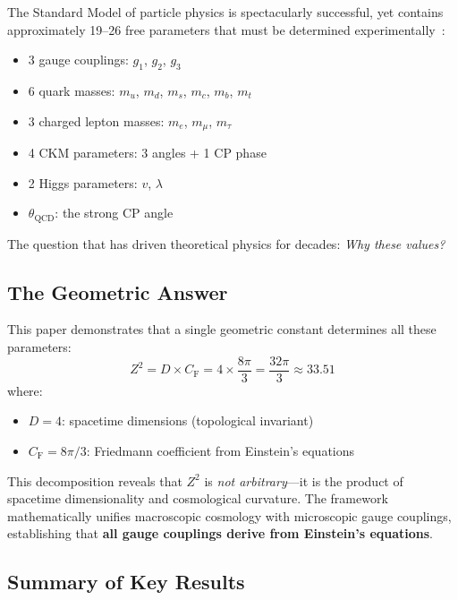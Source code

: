 \documentclass[aps,prd,twocolumn,superscriptaddress,nofootinbib]{revtex4-2}
\newcommand{\Zs}{Z^2}
\newcommand{\CF}{C_{\mathrm{F}}}
\begin{document}
The Standard Model of particle physics is spectacularly successful, yet contains approximately 19--26 free parameters that must be determined experimentally~\cite{PDG2022}:
\begin{itemize}
\item 3 gauge couplings: $g_1$, $g_2$, $g_3$
\item 6 quark masses: $m_u$, $m_d$, $m_s$, $m_c$, $m_b$, $m_t$
\item 3 charged lepton masses: $m_e$, $m_\mu$, $m_\tau$
\item 4 CKM parameters: 3 angles + 1 CP phase
\item 2 Higgs parameters: $v$, $\lambda$
\item $\theta_{\mathrm{QCD}}$: the strong CP angle
\end{itemize}
The question that has driven theoretical physics for decades: \emph{Why these values?}

\subsection{The Geometric Answer}

This paper demonstrates that a single geometric constant determines all these parameters:
\begin{equation}
\boxed{\Zs = D \times \CF = 4 \times \frac{8\pi}{3} = \frac{32\pi}{3} \approx 33.51}
\label{eq:Z2fundamental}
\end{equation}
where:
\begin{itemize}
\item $D = 4$: spacetime dimensions (topological invariant)
\item $\CF = 8\pi/3$: Friedmann coefficient from Einstein's equations
\end{itemize}

This decomposition reveals that $\Zs$ is \emph{not arbitrary}---it is the product of spacetime dimensionality and cosmological curvature. The framework mathematically unifies macroscopic cosmology with microscopic gauge couplings, establishing that \textbf{all gauge couplings derive from Einstein's equations}.

\subsection{Summary of Key Results}
\end{document}
